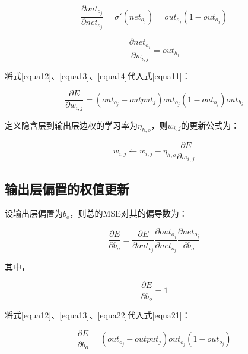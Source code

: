 \documentclass[forprint]{WHUBachelor}
\begin{document}
      \begin{equation}
        \frac{\partial{out_{o_j}}}{\partial{net_{o_j}}}
        =\sigma'(net_{o_j})
        =out_{o_j}(1-out_{o_j})
        \label{equa13}
      \end{equation}

      \begin{equation}
        \frac{\partial{net_{o_j}}}{\partial{w_{i,j}}}
        =out_{h_i}
        \label{equa14}
      \end{equation}

      将式\ref{equa12}、\ref{equa13}、\ref{equa14}代入式\ref{equa11}：
      
      \begin{equation}
        \frac{\partial{E}}{\partial{w_{i,j}}}=
        (out_{o_j}-output_j)out_{o_j}(1-out_{o_j})out_{h_i}
      \end{equation}

      定义隐含层到输出层边权的学习率为$\eta_{h,o}$，则$w_{i,j}$的更新公式为：

      \begin{equation}
        w_{i,j}\gets w_{i,j}-\eta_{h,o}\frac{\partial{E}}{\partial{w_{i,j}}}
      \end{equation}
    
    \subsection{输出层偏置的权值更新}
      设输出层偏置为$b_o$，则总的MSE对其的偏导数为：

      \begin{equation}
        \frac{\partial{E}}{\partial{b_o}}=
        \frac{\partial{E}}{\partial{out_{o_j}}}
        \frac{\partial{out_{o_j}}}{\partial{net_{o_j}}}
        \frac{\partial{net_{o_j}}}{\partial{b_o}}
        \label{equa21}
      \end{equation}

      其中，

      \begin{equation}
        \frac{\partial{E}}{\partial{b_o}}=1
        \label{equa22}
      \end{equation}

      将式\ref{equa12}、\ref{equa13}、\ref{equa22}代入式\ref{equa21}：
      
      \begin{equation}
        \frac{\partial{E}}{\partial{b_o}}=
        (out_{o_j}-output_j)out_{o_j}(1-out_{o_j})
      \end{equation}
\end{document}
